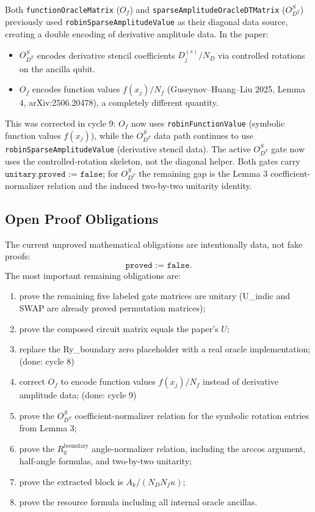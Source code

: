 Both \texttt{functionOracleMatrix} ($O_f$) and
\texttt{sparseAmplitudeOracleDTMatrix} ($O_{D^T}^S$) previously used
\texttt{robinSparseAmplitudeValue} as their diagonal data source,
creating a double encoding of derivative amplitude data.
In the paper:
\begin{itemize}
  \item $O_{D^T}^S$ encodes derivative stencil coefficients $D_j^{(s)}/N_D$
    via controlled rotations on the ancilla qubit.
  \item $O_f$ encodes function values $f(x_j)/N_f$
    (Guseynov--Huang--Liu 2025, Lemma 4, arXiv:2506.20478),
    a completely different quantity.
\end{itemize}
This was corrected in cycle 9: $O_f$ now uses \texttt{robinFunctionValue}
(symbolic function values $f(x_j)$), while the $O_{D^T}^S$ data path continues
to use \texttt{robinSparseAmplitudeValue} (derivative stencil data).  The
active $O_{D^T}^S$ gate now uses the controlled-rotation skeleton, not the
diagonal helper.  Both gates carry $\texttt{unitary.proved := false}$; for
$O_{D^T}^S$ the remaining gap is the Lemma 3 coefficient-normalizer relation
and the induced two-by-two unitarity identity.

\subsection{Open Proof Obligations}

The current unproved mathematical obligations are intentionally data, not fake
proofs:
\[
  \texttt{proved := false}.
\]
The most important remaining obligations are:

\begin{enumerate}
  \item prove the remaining five labeled gate matrices are unitary
    (U\_indic and SWAP are already proved permutation matrices);
  \item prove the composed circuit matrix equals the paper's \(U\);
  \item replace the Ry\_boundary zero placeholder with a real oracle implementation; (done: cycle 8)
  \item correct $O_f$ to encode function values $f(x_j)/N_f$ instead of derivative amplitude data; (done: cycle 9)
  \item prove the $O_{D^T}^S$ coefficient-normalizer relation for the symbolic rotation entries from Lemma 3;
  \item prove the $R_y^{\text{boundary}}$ angle-normalizer relation, including the arccos argument, half-angle formulas, and two-by-two unitarity;
  \item prove the extracted block is \(A_k/(N_DN_f\kappa)\);
  \item prove the resource formula including all internal oracle ancillas.
\end{enumerate}

